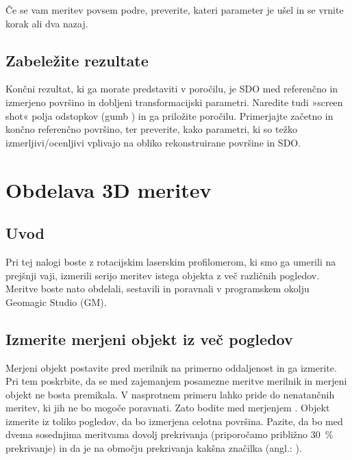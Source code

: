 \documentclass[letterpaper,10pt,english]{sphinxmanual}
\begin{document}
\sphinxAtStartPar
Če se vam meritev povsem podre, preverite, kateri parameter je ušel in se vrnite korak ali dva nazaj.


\section{Zabeležite rezultate}
\label{\detokenize{kalibracija:zabelezite-rezultate}}
\sphinxAtStartPar
Končni rezultat, ki ga morate predstaviti v poročilu, je SDO med referenčno in izmerjeno površino in dobljeni transformacijski parametri. Naredite tudi »screen shot« polja odstopkov (gumb ) in ga priložite poročilu.
Primerjajte začetno in končno referenčno površino, ter preverite, kako parametri, ki so težko izmerljivi/ocenljivi vplivajo na obliko rekonstruirane površine in SDO.


\chapter{Obdelava 3D meritev}
\label{\detokenize{obdelava_3D_meritev:obdelava-3d-meritev}}\label{\detokenize{obdelava_3D_meritev:id1}}\label{\detokenize{obdelava_3D_meritev::doc}}

\section{Uvod}
\label{\detokenize{obdelava_3D_meritev:uvod}}
\sphinxAtStartPar
Pri tej nalogi boste z rotacijskim laserskim profilomerom, ki smo ga umerili na prejšnji vaji, izmerili serijo meritev istega objekta z več različnih pogledov. Meritve boste nato obdelali, sestavili in poravnali v programskem okolju Geomagic Studio (GM).


\section{Izmerite merjeni objekt iz več pogledov}
\label{\detokenize{obdelava_3D_meritev:izmerite-merjeni-objekt-iz-vec-pogledov}}
\sphinxAtStartPar
Merjeni objekt postavite pred merilnik na primerno oddaljenost in ga izmerite. Pri tem poskrbite, da se med zajemanjem posamezne meritve merilnik in merjeni objekt ne bosta premikala. V nasprotnem primeru lahko pride do nenatančnih meritev, ki jih ne bo mogoče poravnati. Zato bodite med merjenjem .
Objekt izmerite iz toliko pogledov, da bo izmerjena celotna površina. Pazite, da bo med dvema sosednjima meritvama dovolj prekrivanja (priporočamo približno 30 \% prekrivanje) in da je na območju prekrivanja kakšna značilka (angl.: ).
\end{document}
